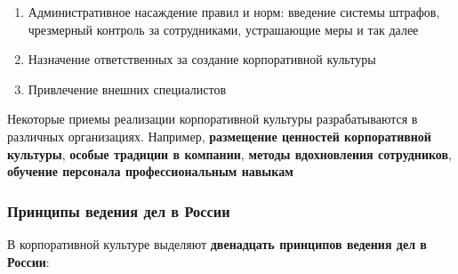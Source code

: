 \documentclass{article}
\begin{document}
\begin{enumerate}
    \item Административное насаждение правил и норм: введение системы штрафов, чрезмерный контроль за сотрудниками, устрашающие меры и так далее
    \item Назначение ответственных за создание корпоративной культуры
    \item Привлечение внешних специалистов
\end{enumerate}

Некоторые приемы реализации корпоративной культуры разрабатываются в различных организациях. Например, \textbf{размещение ценностей корпоративной культуры}, \textbf{особые традиции в компании}, \textbf{методы вдохновления сотрудников}, \textbf{обучение персонала профессиональным навыкам}

\subsubsection{Принципы ведения дел в России}

В корпоративной культуре выделяют \textbf{двенадцать принципов ведения дел в России}:
\end{document}
